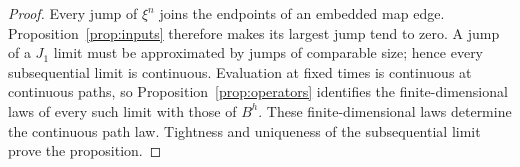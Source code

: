 \begin{proof}
Every jump of $\xi^n$ joins the endpoints of an embedded map edge.
Proposition~\ref{prop:inputs} therefore makes its largest jump tend to zero.
A jump of a $J_1$ limit must be approximated by jumps of comparable size;
hence every subsequential limit is continuous. Evaluation at fixed times is
continuous at continuous paths, so Proposition~\ref{prop:operators}
identifies the finite-dimensional laws of every such limit with those of
$B^h$. These finite-dimensional laws determine the continuous path law.
Tightness and uniqueness of the subsequential limit prove the proposition.
\end{proof}
